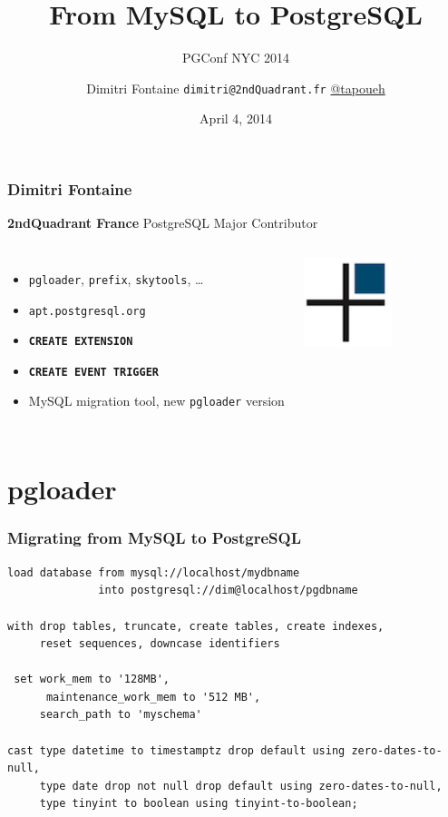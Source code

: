 \documentclass{beamer}
\title{From MySQL to PostgreSQL}
\subtitle{PGConf NYC 2014}
\author{Dimitri Fontaine \texttt{dimitri@2ndQuadrant.fr}
  \linebreak
  \url{@tapoueh}}
\date{April 4, 2014}
\begin{document}
\frame{\titlepage}

\begin{frame}[fragile]
  \frametitle{Dimitri Fontaine}

  \begin{center}
    \textbf{2ndQuadrant France}
    \linebreak
    PostgreSQL Major Contributor
  \end{center}
  \vfill

\begin{columns}[c]

  \begin{itemize}
   \item \texttt{pgloader}, \texttt{prefix}, \texttt{skytools}, …
   \item \texttt{apt.postgresql.org}
   \item \texttt{\textbf{CREATE EXTENSION}}
   \item \texttt{\textbf{CREATE EVENT TRIGGER}}
   \item MySQL migration tool, new \texttt{pgloader} version
  \end{itemize}  

\begin{center}
  \includegraphics[height=7em]{2ndQuadrant-cross.png}
\end{center}
\end{columns}
\end{frame}

\section{pgloader}

\begin{frame}[fragile]
  \frametitle{Migrating from MySQL to PostgreSQL}
  
  \vfill

\begin{verbatim}
load database from mysql://localhost/mydbname
              into postgresql://dim@localhost/pgdbname

with drop tables, truncate, create tables, create indexes,
     reset sequences, downcase identifiers

 set work_mem to '128MB',
      maintenance_work_mem to '512 MB',
     search_path to 'myschema'

cast type datetime to timestamptz drop default using zero-dates-to-null,
     type date drop not null drop default using zero-dates-to-null,
     type tinyint to boolean using tinyint-to-boolean;
\end{verbatim}
\end{frame}
\end{document}
